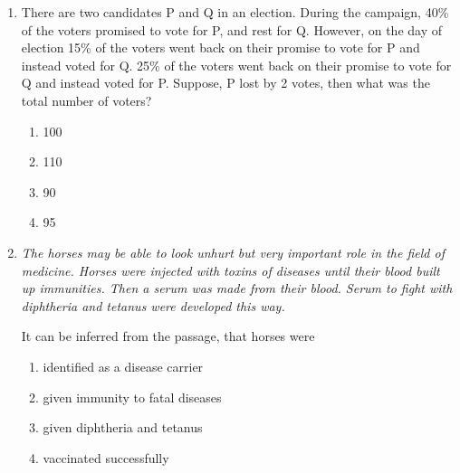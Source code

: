 \documentclass[journal,12pt,onecolumn]{IEEEtran}
\theoremstyle{remark}
\begin{document}
\begin{enumerate}
\begin{multicols}{2}
\begin{enumerate}
    \item identified
    \item ascertained
    \item exacerbated
    \item analysed
\end{enumerate}
\end{multicols}

 


\item    \hspace{0.5cm} There are two candidates P and Q in an election. During the campaign, 40\% of the voters promised to vote for P, and rest for Q. However, on the day of election 15\% of the voters went back on their promise to vote for P and instead voted for Q. 25\% of the voters went back on their promise to vote for Q and instead voted for P. Suppose, P lost by 2 votes, then what was the total number of voters?  \hfill{}

\begin{multicols}{2}
\begin{enumerate}
    \item 100
    \item 110
    \item 90
    \item 95
\end{enumerate}
\end{multicols}

 



 

\item    \hspace{0.5cm} \textit{The horses may be able to look unhurt but very important role in the field of medicine. Horses were injected with toxins of diseases until their blood built up immunities. Then a serum was made from their blood. Serum to fight with diphtheria and tetanus were developed this way.}

It can be inferred from the passage, that horses were  \hfill{}

\begin{multicols}{2}
\begin{enumerate}
    \item identified as a disease carrier
    \item given immunity to fatal diseases
    \item given diphtheria and tetanus
    \item vaccinated successfully
\end{enumerate}
\end{multicols}
 


\end{enumerate}
\end{document}
